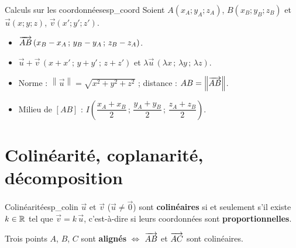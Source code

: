 \begin{propriete}{Calculs sur les coordonnées}{esp_coord}
	Soient $A(x_A;y_A;z_A)$, $B(x_B;y_B;z_B)$ et $\vec u(x;y;z)$, $\vec v(x';y';z')$.
	\begin{itemize}[label=\textbullet]
		\item $\overrightarrow{AB}\,(x_B - x_A\,;\,y_B - y_A\,;\,z_B - z_A)$.
		\item $\vec u + \vec v\,(x + x'\,;\,y + y'\,;\,z + z')$ \quad et \quad
		$\lambda\vec u\,(\lambda x\,;\,\lambda y\,;\,\lambda z)$.
		\item Norme : $\left\|\vec u\right\| = \sqrt{x^2 + y^2 + z^2}$ \quad ;
		\quad distance : $AB = \left\|\overrightarrow{AB}\right\|$.
		\item Milieu de $[AB]$ : $I\!\left(\dfrac{x_A+x_B}{2}\,;\,\dfrac{y_A+y_B}{2}\,;\,\dfrac{z_A+z_B}{2}\right)$.
	\end{itemize}
\end{propriete}

\begin{center}
\end{center}


\section{Colinéarité, coplanarité, décomposition}

\begin{propriete}{Colinéarité}{esp_colin}
	$\vec u$ et $\vec v$ ($\vec u \neq \vec 0$) sont \textbf{colinéaires} si et
	seulement s'il existe $k \in \mathbb{R}$ tel que $\vec v = k\,\vec u$, c'est-à-dire
	si leurs coordonnées sont \textbf{proportionnelles}.

	Trois points $A$, $B$, $C$ sont \textbf{alignés} $\iff$ $\overrightarrow{AB}$ et
	$\overrightarrow{AC}$ sont colinéaires.
\end{propriete}

